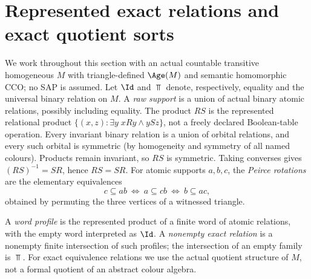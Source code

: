\section{Represented exact relations and exact quotient sorts}
We work throughout this section with an actual countable transitive
homogeneous $M$ with triangle-defined $\Age(M)$ and semantic
homomorphic CCO; no SAP is assumed. Let $\Id$ and $\Top$ denote,
respectively, equality and the universal binary relation on $M$.
A \emph{raw support} is a union of actual binary atomic relations,
possibly including equality. The product $RS$ is the represented
relational product $\{(x,z):\exists y\;xRy\wedge ySz\}$, not a freely
declared Boolean-table operation. Every invariant binary relation is a union of orbital relations,
and every such orbital is symmetric (by homogeneity and symmetry of
all named colours).  Products remain invariant, so $RS$ is
symmetric.  Taking converses gives $(RS)^{-1}=SR$, hence $RS=SR$. For atomic supports $a,b,c$, the
\emph{Peirce rotations} are the elementary equivalences
\[
 c\subseteq ab\ \Longleftrightarrow\ a\subseteq cb
 \ \Longleftrightarrow\ b\subseteq ac,
\]
obtained by permuting the three vertices of a witnessed triangle.

A \emph{word profile} is the represented product of a finite word of
atomic relations, with the empty word interpreted as $\Id$.
A \emph{nonempty exact relation} is a nonempty finite intersection of
such profiles; the intersection of an empty family is $\Top$.
For exact equivalence relations we use the actual quotient structure
of $M$, not a formal quotient of an abstract colour algebra.

